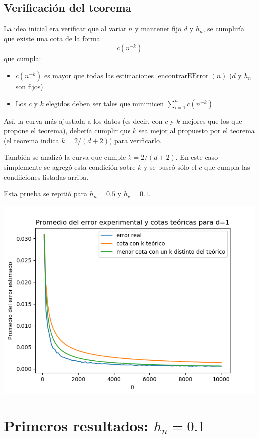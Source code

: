 \documentclass[12pt, a4paper]{article}
\begin{document}
\subsection{Verificación del teorema}
La idea inicial era verificar que al variar $n$ y mantener fijo $d$ y $h_n$, se cumpliría que existe una cota de la forma $$c(n^{-k})$$ que cumpla:
\begin{itemize}
  \item $c(n^{-k})$ es mayor que todas las estimaciones $\mathop{encontrarEError}(n)$ ($d$ y $h_n$ son fijos)
  \item Los $c$ y $k$ elegidos deben ser tales que minimicen $\sum_{i=1}^n c(n^{-k})$
\end{itemize}
Así, la curva más ajustada a los datos (es decir, con $c$ y $k$ mejores que los que propone el teorema), debería cumplir que $k$ sea mejor al propuesto por el teorema (el teorema indica $k=2/(d+2)$) para verificarlo.

También se analizó la curva que cumple $k=2/(d+2)$. En este caso simplemente se agregó esta condición sobre $k$ y se buscó sólo el $c$ que cumpla las condiiciones listadas arriba.

Esta prueba se repitió para $h_n=0.5$ y $h_n=0.1$.

\includegraphics[width=\textwidth]{figuras_h=0.1/cotas-error-d=1}

\section{Primeros resultados: $h_n=0.1$}
\end{document}
